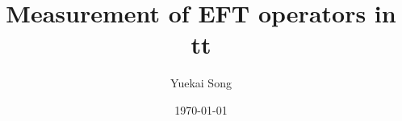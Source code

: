 \documentclass{beamer}
\title{Measurement of EFT operators in tt}
\author{Yuekai Song}
\institute{ZJU}
\date{\today}
\begin{document}
\frame{\titlepage}

\begin{frame}
    \begin{multicols}{3}
        \tableofcontents[sections={1-2}] %
    \end{multicols}
\end{frame}

\begin{frame}
    \begin{multicols}{3}
        \tableofcontents[sections={3}]
    \end{multicols}
\end{frame}

\begin{frame}
    \begin{multicols}{3}
        \tableofcontents[sections={4}]
    \end{multicols}
\end{frame}
\end{document}
